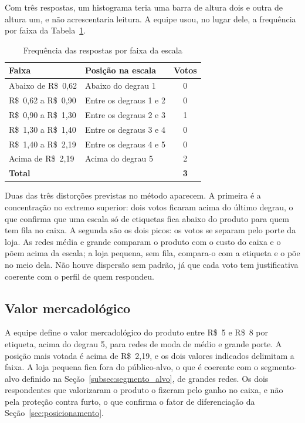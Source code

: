 Com três respostas, um histograma teria uma barra de altura dois e outra de altura um, e não acrescentaria leitura. A equipe usou, no lugar dele, a frequência por faixa da Tabela~\ref{tab:escala_frequencia}.

\begin{table}[H]
    \centering
    \caption{Frequência das respostas por faixa da escala}
    \label{tab:escala_frequencia}
    \footnotesize
    \renewcommand{\arraystretch}{1.2}
    \begin{tabular}{@{}llc@{}}
        \toprule
        \textbf{Faixa} & \textbf{Posição na escala} & \textbf{Votos} \\
        \midrule
        Abaixo de R\$~0,62 & Abaixo do degrau 1 & 0 \\
        R\$~0,62 a R\$~0,90 & Entre os degraus 1 e 2 & 0 \\
        R\$~0,90 a R\$~1,30 & Entre os degraus 2 e 3 & 1 \\
        R\$~1,30 a R\$~1,40 & Entre os degraus 3 e 4 & 0 \\
        R\$~1,40 a R\$~2,19 & Entre os degraus 4 e 5 & 0 \\
        Acima de R\$~2,19 & Acima do degrau 5 & 2 \\
        \midrule
        \textbf{Total} & & \textbf{3} \\
        \bottomrule
    \end{tabular}
\end{table}

Duas das três distorções previstas no método aparecem. A primeira é a concentração no extremo superior: dois votos ficaram acima do último degrau, o que confirma que uma escala só de etiquetas fica abaixo do produto para quem tem fila no caixa. A segunda são os dois picos: os votos se separam pelo porte da loja. As redes média e grande comparam o produto com o custo do caixa e o põem acima da escala; a loja pequena, sem fila, compara-o com a etiqueta e o põe no meio dela. Não houve dispersão sem padrão, já que cada voto tem justificativa coerente com o perfil de quem respondeu.

\subsection{Valor mercadológico}
\label{subsec:escala_valor}

A equipe define o valor mercadológico do produto entre R\$~5 e R\$~8 por etiqueta, acima do degrau 5, para redes de moda de médio e grande porte. A posição mais votada é acima de R\$~2,19, e os dois valores indicados delimitam a faixa. A loja pequena fica fora do público-alvo, o que é coerente com o segmento-alvo definido na Seção~\ref{subsec:segmento_alvo}, de grandes redes. Os dois respondentes que valorizaram o produto o fizeram pelo ganho no caixa, e não pela proteção contra furto, o que confirma o fator de diferenciação da Seção~\ref{sec:posicionamento}.

